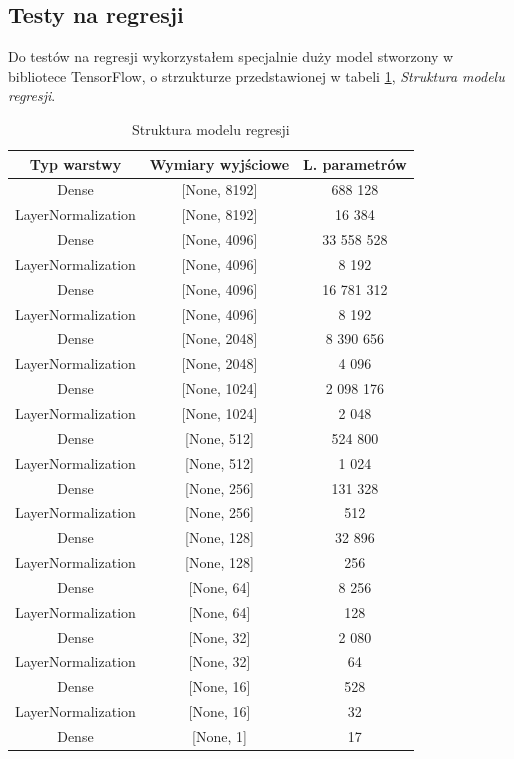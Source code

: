 \subsection{Testy na regresji}
Do testów na regresji wykorzystałem specjalnie duży model stworzony w bibliotece TensorFlow, o strzukturze przedstawionej w tabeli \ref{tab:regression_model_structure}, \textit{Struktura modelu regresji}. \\
\begin{table}[htbp]
    \centering
    \caption{Struktura modelu regresji}
    \label{tab:regression_model_structure}
    \begin{tabular}{|c|c|c|}
        \hline
        \textbf{Typ warstwy} & \textbf{Wymiary wyjściowe} & \textbf{L. parametrów} \\
        \hline
        Dense & [None, 8192] & 688 128 \\
        \hline
        LayerNormalization & [None, 8192] & 16 384 \\
        \hline
        Dense & [None, 4096] & 33 558 528 \\
        \hline
        LayerNormalization & [None, 4096] & 8 192 \\
        \hline
        Dense & [None, 4096] & 16 781 312 \\
        \hline
        LayerNormalization & [None, 4096] & 8 192 \\
        \hline
        Dense & [None, 2048] & 8 390 656 \\
        \hline
        LayerNormalization & [None, 2048] & 4 096 \\
        \hline
        Dense & [None, 1024] & 2 098 176 \\
        \hline
        LayerNormalization & [None, 1024] & 2 048 \\
        \hline
        Dense & [None, 512] & 524 800 \\
        \hline
        LayerNormalization & [None, 512] & 1 024 \\
        \hline
        Dense & [None, 256] & 131 328 \\
        \hline
        LayerNormalization & [None, 256] & 512 \\
        \hline
        Dense & [None, 128] & 32 896 \\
        \hline
        LayerNormalization & [None, 128] & 256 \\
        \hline
        Dense & [None, 64] & 8 256 \\
        \hline
        LayerNormalization & [None, 64] & 128 \\
        \hline
        Dense & [None, 32] & 2 080 \\
        \hline
        LayerNormalization & [None, 32] & 64 \\
        \hline
        Dense & [None, 16] & 528 \\
        \hline
        LayerNormalization & [None, 16] & 32 \\
        \hline
        Dense & [None, 1] & 17 \\
        \hline
    \end{tabular}
\end{table}
